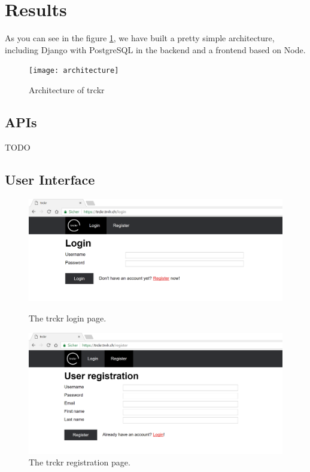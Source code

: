 \documentclass[a4paper, 12pt, headsepline]{scrartcl}
\begin{document}
\section{Results}
As you can see in the figure \ref{fig:architecture}, we have built a pretty simple architecture,
including Django with PostgreSQL in the backend and a frontend based on Node.

\begin{figure}[h]
    \texttt{[image: architecture]}
    \caption{Architecture of trckr}
    \label{fig:architecture}
\end{figure}

\subsection{APIs}
TODO

\subsection{User Interface}

\begin{figure}[h]
    \includegraphics[width=\textwidth]{trckr-login}
    \caption{The trckr login page.}
    \label{fig:trckr-login}

    \includegraphics[width=\textwidth]{trckr-register}
    \caption{The trckr registration page.}
    \label{fig:trckr-register}
\end{figure}
\end{document}
